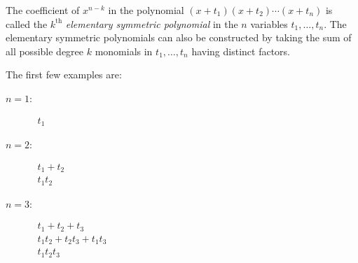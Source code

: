 \documentclass{article}
\begin{document}
The coefficient of $x^{n-k}$ in the polynomial $(x+t_1) (x+t_2) \cdots (x+t_n)$ is called the $k^\mathrm{th}$ \emph{elementary symmetric polynomial} in the $n$ variables $t_1, \dots, t_n$. The elementary symmetric polynomials can also be constructed by taking the sum of all possible degree $k$ monomials in $t_1,\dots, t_n$ having distinct factors.

The first few examples are:
\begin{description}
\item[$n=1$:]
$
\begin{array}{l}
t_1
\end{array}
$
\item[$n=2$:]

$
\begin{array}{l}
 t_1 + t_2\\
 t_1 t_2
\end{array}
$
\item[$n=3$:]

$
\begin{array}{l}
 t_1 + t_2 + t_3\\
 t_1 t_2 + t_2 t_3 + t_1 t_3\\
 t_1 t_2 t_3
\end{array}
$
\end{description}
\end{document}
